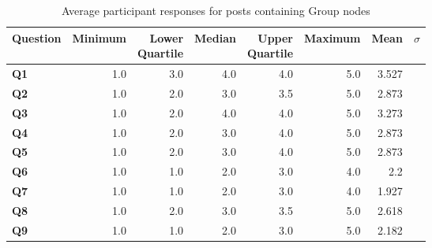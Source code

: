 \begin{table}
\centering
\caption{Average participant responses for posts containing Group nodes}
\label{table:perception:group-average}
\begin{tabular}{ l | r | r | r | r | r | r | r}
\textbf{Question} & \textbf{Minimum} & \pbox{2cm}{\textbf{Lower}\\ \textbf{Quartile}} & \textbf{Median} & \pbox{2cm}{\textbf{Upper}\\ \textbf{Quartile}} & \textbf{Maximum} & \textbf{Mean} & \textbf{$\sigma$}\\
\hline
\textbf{Q1} &  1.0 & 3.0 & 4.0 & 4.0 & 5.0 & 3.527 &  \\
\hline
\textbf{Q2} &  1.0 & 2.0 & 3.0 & 3.5 & 5.0 & 2.873 &  \\
\hline
\textbf{Q3} &  1.0 & 2.0 & 4.0 & 4.0 & 5.0 & 3.273 &  \\
\hline
\textbf{Q4} &  1.0 & 2.0 & 3.0 & 4.0 & 5.0 & 2.873 &  \\
\hline
\textbf{Q5} &  1.0 & 2.0 & 3.0 & 4.0 & 5.0 & 2.873 &  \\
\hline
\textbf{Q6} &  1.0 & 1.0 & 2.0 & 3.0 & 4.0 & 2.2 &  \\
\hline
\textbf{Q7} &  1.0 & 1.0 & 2.0 & 3.0 & 4.0 & 1.927 &  \\
\hline
\textbf{Q8} &  1.0 & 2.0 & 3.0 & 3.5 & 5.0 & 2.618 &  \\
\hline
\textbf{Q9} &  1.0 & 1.0 & 2.0 & 3.0 & 5.0 & 2.182 &  \\
\end{tabular}
\end{table}




